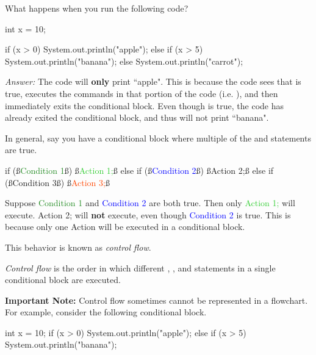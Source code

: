 \begin{example}
What happens when you run the following code?

\begin{code}
int x = 10;

if (x > 0) 
{
    System.out.println("apple");
} 
else if (x > 5) 
{
    System.out.println("banana");
} 
else 
{
    System.out.println("carrot");
} 
\end{code}

\textit{Answer: } The code will \textbf{only} print ``apple". This is because the code sees that  is true, executes the commands in that portion of the code (i.e. ), and then immediately exits the conditional block. Even though  is true, the code has already exited the conditional block, and thus will not print ``banana".

\end{example}


In general, say you have a conditional block where multiple of the  and  statements are true.

\begin{code}
if (ß\textcolor{ForestGreen}{Condition 1}ß) 
{
    ß\textcolor{LimeGreen}{Action 1;}ß
}
else if (ß\textcolor{Blue}{Condition 2}ß)
{
    ß\textcolor{Cerulean}{Action 2;}ß
}
else if (ß\textcolor{Mahogany}{Condition 3}ß)
{
    ß\textcolor{OrangeRed}{Action 3;}ß
}
\end{code}

Suppose \textcolor{ForestGreen}{Condition 1} and \textcolor{Blue}{Condition 2} are both true. Then only \textcolor{LimeGreen}{Action 1;} will execute. \textcolor{Cerulean}{Action 2;} will \textbf{not} execute, even though \textcolor{Blue}{Condition 2} is true. This is because only one Action will be executed in a conditional block.

This behavior is known as \emph{control flow}. 
\begin{definition}
\emph{Control flow} is the order in which different , , and  statements in a single conditional block are executed.
\end{definition}

\noindent \textbf{Important Note:} Control flow sometimes cannot be represented in a flowchart. For example, consider the following conditional block.

\begin{code}
int x = 10;
if (x > 0) 
{
    System.out.println("apple");
} 
else if (x > 5) 
{
    System.out.println("banana");
}
\end{code}

